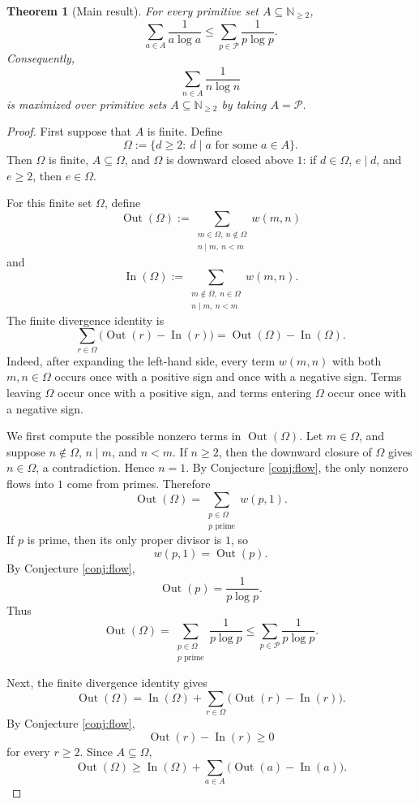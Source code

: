 \documentclass{amsart}
\newtheorem{theorem}{Theorem}
\newcommand{\N}{\mathbb N}
\newcommand{\Pp}{\mathcal P}
\begin{document}
\begin{theorem}[Main result]
For every primitive set \(A\subseteq \N_{\geq 2}\),
\[
\sum_{a\in A}\frac{1}{a\log a}
\leq
\sum_{p\in\Pp}\frac{1}{p\log p}.
\]
Consequently,
\[
\sum_{n\in A}\frac{1}{n\log n}
\]
is maximized over primitive sets \(A\subseteq \N_{\geq 2}\) by taking \(A=\Pp\).
\end{theorem}

\begin{proof}
First suppose that \(A\) is finite.  Define
\[
\Omega
:=
\{d\geq 2:\ d\mid a \text{ for some } a\in A\}.
\]
Then \(\Omega\) is finite, \(A\subseteq \Omega\), and \(\Omega\) is downward closed above \(1\): if \(d\in\Omega\), \(e\mid d\), and \(e\geq 2\), then \(e\in\Omega\).

For this finite set \(\Omega\), define
\[
\operatorname{Out}(\Omega)
:=
\sum_{\substack{m\in\Omega,\ n\notin\Omega\\ n\mid m,\ n<m}}
w(m,n)
\]
and
\[
\operatorname{In}(\Omega)
:=
\sum_{\substack{m\notin\Omega,\ n\in\Omega\\ n\mid m,\ n<m}}
w(m,n).
\]
The finite divergence identity is
\[
\sum_{r\in\Omega}
\bigl(\operatorname{Out}(r)-\operatorname{In}(r)\bigr)
=
\operatorname{Out}(\Omega)-\operatorname{In}(\Omega).
\]
Indeed, after expanding the left-hand side, every term \(w(m,n)\) with both \(m,n\in\Omega\) occurs once with a positive sign and once with a negative sign.  Terms leaving \(\Omega\) occur once with a positive sign, and terms entering \(\Omega\) occur once with a negative sign.

We first compute the possible nonzero terms in \(\operatorname{Out}(\Omega)\).  Let \(m\in\Omega\), and suppose \(n\notin\Omega\), \(n\mid m\), and \(n<m\).  If \(n\geq 2\), then the downward closure of \(\Omega\) gives \(n\in\Omega\), a contradiction.  Hence \(n=1\).  By Conjecture \ref{conj:flow}, the only nonzero flows into \(1\) come from primes.  Therefore
\[
\operatorname{Out}(\Omega)
=
\sum_{\substack{p\in\Omega\\ p\text{ prime}}}
w(p,1).
\]
If \(p\) is prime, then its only proper divisor is \(1\), so
\[
w(p,1)=\operatorname{Out}(p).
\]
By Conjecture \ref{conj:flow},
\[
\operatorname{Out}(p)=\frac{1}{p\log p}.
\]
Thus
\[
\operatorname{Out}(\Omega)
=
\sum_{\substack{p\in\Omega\\ p\text{ prime}}}
\frac{1}{p\log p}
\leq
\sum_{p\in\Pp}\frac{1}{p\log p}.
\]

Next, the finite divergence identity gives
\[
\operatorname{Out}(\Omega)
=
\operatorname{In}(\Omega)
+
\sum_{r\in\Omega}
\bigl(\operatorname{Out}(r)-\operatorname{In}(r)\bigr).
\]
By Conjecture \ref{conj:flow},
\[
\operatorname{Out}(r)-\operatorname{In}(r)\geq 0
\]
for every \(r\geq 2\).  Since \(A\subseteq\Omega\),
\[
\operatorname{Out}(\Omega)
\geq
\operatorname{In}(\Omega)
+
\sum_{a\in A}
\bigl(\operatorname{Out}(a)-\operatorname{In}(a)\bigr).
\]


\end{proof}
\end{document}
